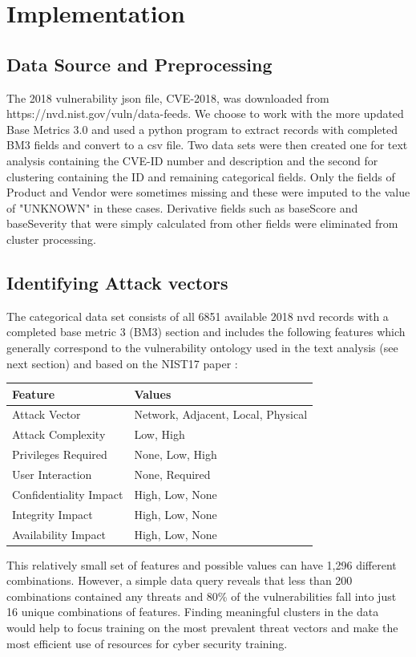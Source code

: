 \documentclass{article} %
\begin{document}
\section{Implementation}
\subsection{Data Source and Preprocessing}
The 2018 vulnerability json file, CVE-2018, was downloaded from https://nvd.nist.gov/vuln/data-feeds.  We choose to work with the more updated
Base Metrics 3.0 and used a python program to extract records with completed BM3 fields and convert to a csv file.  Two data sets were then created one for text analysis containing the CVE-ID number and description and the second for clustering containing the ID and remaining categorical fields.  Only the fields of Product and Vendor were sometimes missing and these were imputed to the value of "UNKNOWN" in these cases.  Derivative fields such as baseScore and baseSeverity that were simply calculated from other fields were eliminated from cluster processing.

\subsection{Identifying Attack vectors}
The categorical data set consists of all 6851 available 2018 nvd records with a completed base metric 3 (BM3) section and includes the following features which generally correspond to the vulnerability ontology used in the text analysis (see next section) and based on the NIST17 paper \cite{}: 
\begin{center}
\begin{tabular}{ |l|l| } \hline
Feature & Values\\\hline
Attack Vector & Network, Adjacent, Local, Physical  \\ 
Attack Complexity & Low, High  \\ 
Privileges Required & None, Low, High  \\ 
User Interaction & None, Required  \\ 
Confidentiality Impact & High, Low, None\\
Integrity Impact & High, Low, None\\
Availability Impact & High, Low, None\\
\hline
\end{tabular}
\end{center}


This relatively small set of features and possible values can have 1,296 different combinations.  However, a simple data query reveals that less than 200 combinations contained any threats and 80\% of the vulnerabilities fall into just 16 unique combinations of features. Finding meaningful clusters in the data would help to focus training on the most prevalent threat vectors and make the most efficient use of resources for cyber security training.  
\end{document}
